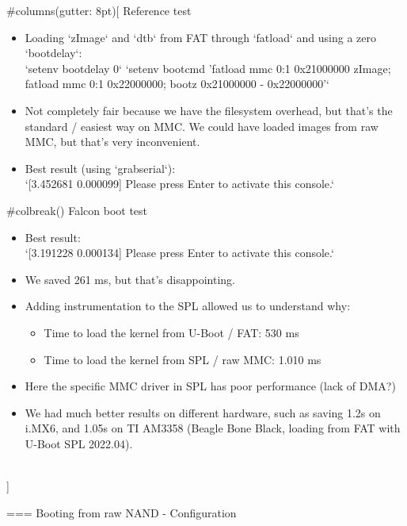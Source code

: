 #columns(gutter: 8pt)[
         Reference test
	\begin{itemize}
           \item Loading `zImage` and `dtb` from FAT through
                 `fatload` and using a zero `bootdelay`:\\
	         `setenv bootdelay 0`
	         `setenv bootcmd 'fatload mmc 0:1 0x21000000 zImage; fatload mmc 0:1 0x22000000; bootz 0x21000000 - 0x22000000'`
	   \item Not completely fair because we have the filesystem overhead, but that's the standard / easiest way on MMC.
		 We could have loaded images from raw MMC, but that's very inconvenient.
	   \item Best result (using `grabserial`):\\
		 `[3.452681 0.000099] Please press Enter to activate this console.`
	\end{itemize}
   #colbreak()
        Falcon boot test
	\begin{itemize}
	   \item Best result:\\
		 `[3.191228 0.000134] Please press Enter to activate this console.`
	   \item We saved 261 ms, but that's disappointing.
	   \item Adding instrumentation to the SPL allowed us to understand why:
	   \begin{itemize}
	      \scriptsize
	      \item Time to load the kernel from U-Boot / FAT: 530 ms
	      \item Time to load the kernel from SPL / raw MMC: 1.010 ms
	   \end{itemize}
	   \item Here the specific MMC driver in SPL has poor performance (lack
		 of DMA?)
           \item We had much better results on different hardware, such
	         as saving 1.2s on i.MX6, and 1.05s on TI AM3358
                 (Beagle Bone Black, loading from FAT with U-Boot SPL
                 2022.04).
	\end{itemize}
  \\]


=== Booting from raw NAND - Configuration
   
